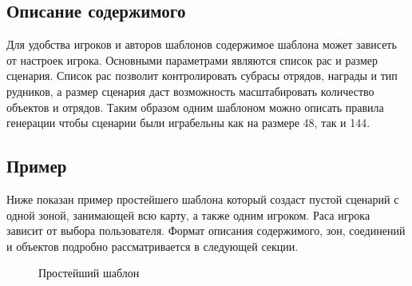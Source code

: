 \subsection{Описание содержимого}
Для удобства игроков и авторов шаблонов содержимое шаблона может зависеть от настроек игрока. Основными параметрами являются список рас и размер сценария.
Список рас позволит контролировать субрасы отрядов, награды и тип рудников, а размер сценария даст возможность масштабировать количество объектов и отрядов.
Таким образом одним шаблоном можно описать правила генерации чтобы сценарии были играбельны как на размере 48, так и 144.

\subsection{Пример}
Ниже показан пример простейшего шаблона который создаст пустой сценарий с одной зоной, занимающей всю карту, а также одним игроком. Раса игрока зависит от выбора пользователя.
Формат описания содержимого, зон, соединений и объектов подробно рассматривается в следующей секции.
\begin{figure}[H]

\caption{Простейший шаблон}
\end{figure}
